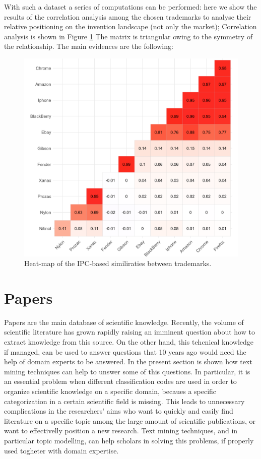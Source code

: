\documentclass[]{book}
\begin{document}
With such a dataset a series of computations can be performed: here we
show the results of the correlation analysis among the chosen trademarks
to analyse their relative positioning on the invention landscape (not
only the market); Correlation analysis is shown in Figure
\ref{fig:similartm} The matrix is triangular owing to the symmetry of
the relationship. The main evidences are the following:

\begin{figure}

{\centering \includegraphics[width=0.8\linewidth]{_bookdown_files/figures/correlation_matrix_tm} 

}

\caption{Heat-map of the IPC-based similiraties between trademarks.}\label{fig:similartm}
\end{figure}

\section{Papers}\label{papers}

Papers are the main database of scientific knowledge. Recently, the
volume of scientific literature has grown rapidly raising an imminent
question about how to extract knowledge from this source. On the other
hand, this tehcnical knowledge if managed, can be used to answer
questions that 10 years ago would need the help of domain experts to be
answered. In the present section is shown how text mining techniques can
help to unswer some of this questions. In particular, it is an essential
problem when different classification codes are used in order to
organize scientific knowledge on a specific domain, becaues a specific
categorization in a certain scientific field is missing. This leads to
unnecessary complications in the researchers' aims who want to quickly
and easily find literature on a specific topic among the large amount of
scientific publications, or want to effectivelly position a new
research. Text mining techniques, and in particular topic modelling, can
help scholars in solving this problems, if properly used togheter with
domain expertise.
\end{document}
